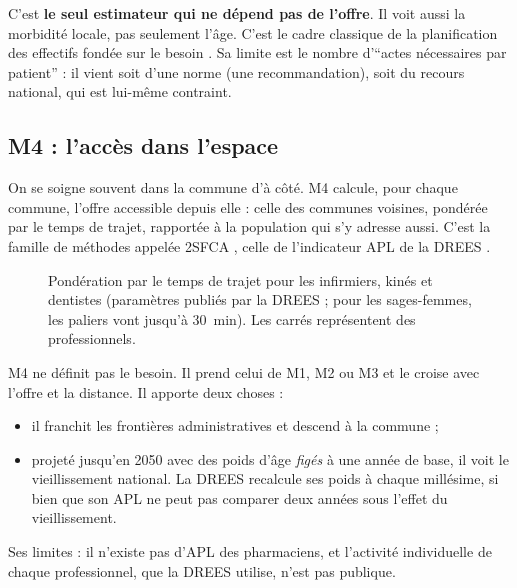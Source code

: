 \documentclass[11pt]{article}
\begin{document}
C'est \textbf{le seul estimateur qui ne dépend pas de l'offre}. Il voit aussi la morbidité locale, pas seulement l'âge.
C'est le cadre classique de la planification des effectifs fondée sur le besoin \citep{birch2007,mackenzie2019}. Sa
limite est le nombre d'\enquote{actes nécessaires par patient} : il vient soit d'une norme (une recommandation), soit
du recours national, qui est lui-même contraint.

\subsection*{M4 : l'accès dans l'espace}
On se soigne souvent dans la commune d'à côté. M4 calcule, pour chaque commune, l'offre accessible depuis elle :
celle des communes voisines, pondérée par le temps de trajet, rapportée à la population qui s'y adresse aussi. C'est
la famille de méthodes appelée 2SFCA \citep{luo2009}, celle de l'indicateur APL de la DREES \citep{barlet2012}.

\begin{figure}[h]
\centering
{}
\caption{Pondération par le temps de trajet pour les infirmiers, kinés et dentistes (paramètres publiés par la DREES ;
pour les sages-femmes, les paliers vont jusqu'à 30~min). Les carrés représentent des professionnels.}
\end{figure}

M4 ne définit pas le besoin. Il prend celui de M1, M2 ou M3 et le croise avec l'offre et la distance. Il apporte deux
choses :
\begin{itemize}
  \item il franchit les frontières administratives et descend à la commune ;
  \item projeté jusqu'en 2050 avec des poids d'âge \emph{figés} à une année de base, il voit le vieillissement
    national. La DREES recalcule ses poids à chaque millésime, si bien que son APL ne peut pas comparer deux années
    sous l'effet du vieillissement.
\end{itemize}
Ses limites : il n'existe pas d'APL des pharmaciens, et l'activité individuelle de chaque professionnel, que la DREES
utilise, n'est pas publique.
\end{document}
